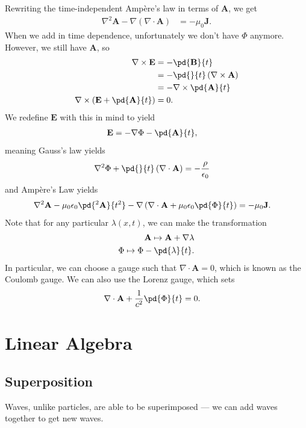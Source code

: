 \documentclass[10pt]{mypackage}
\begin{document}
Rewriting the time-independent Ampère's law in terms of $\mathbf{A}$, we get
\begin{align*}
  \nabla^2\mathbf{A} - \nabla\left(\nabla\cdot \mathbf{A}\right) &= -\mu_0\mathbf{J}.
\end{align*}
When we add in time dependence, unfortunately we don't have $\Phi$ anymore. However, we still have $\mathbf{A}$, so
\begin{align*}
  \nabla \times \mathbf{E} &= -\pd{\mathbf{B}}{t}\\
                           &= -\pd{}{t}\left(\nabla \times \mathbf{A}\right)\\
                           &= -\nabla \times \pd{\mathbf{A}}{t}\\
  \nabla \times \left(\mathbf{E} + \pd{\mathbf{A}}{t}\right) &= 0.
\end{align*}
We redefine $\mathbf{E}$ with this in mind to yield
\begin{align*}
  \mathbf{E} &= -\nabla\Phi - \pd{\mathbf{A}}{t},
\end{align*}
meaning Gauss's law yields
\begin{align*}
  \nabla^2\Phi + \pd{}{t}\left(\nabla \cdot \mathbf{A}\right) &= -\frac{\rho}{\epsilon_0}
\end{align*}
and Ampère's Law yields
\begin{align*}
  \nabla^2\mathbf{A} - \mu_0\epsilon_0 \pd{^2\mathbf{A}}{t^2} - \nabla\left(\nabla\cdot \mathbf{A} + \mu_0\epsilon_0 \pd{\Phi}{t}\right) &= -\mu_0\mathbf{J}.
\end{align*}
Note that for any particular $\lambda (x,t)$, we can make the transformation
\begin{align*}
  \mathbf{A} \mapsto \mathbf{A} + \nabla\lambda\\
  \Phi \mapsto \Phi - \pd{\lambda}{t}.
\end{align*}
In particular, we can choose a gauge such that $\nabla \cdot \mathbf{A} = 0$, which is known as the Coulomb gauge. We can also use the Lorenz gauge, which sets
\begin{align*}
  \nabla \cdot \mathbf{A} + \frac{1}{c^2}\pd{\Phi}{t} &= 0.
\end{align*}
\section{Linear Algebra}%
\subsection{Superposition}%
Waves, unlike particles, are able to be superimposed --- we can add waves together to get new waves.\newline
\end{document}
